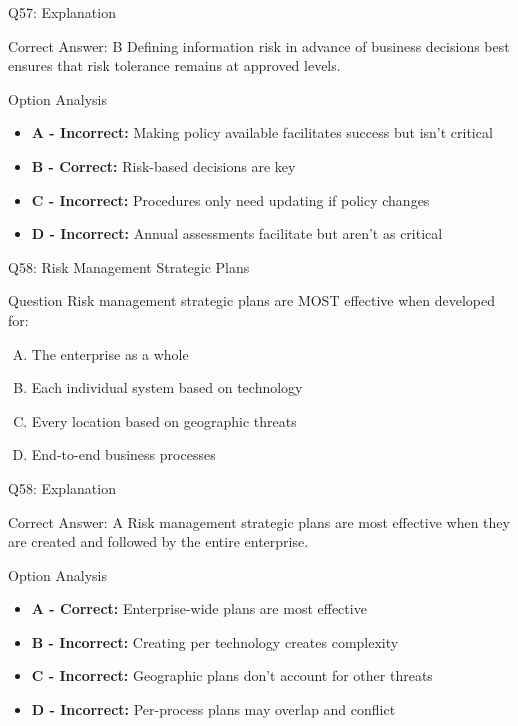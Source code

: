\documentclass{beamer}
\begin{document}
	\begin{frame}{Q57: Explanation}
		\begin{block}{Correct Answer: B}
			Defining information risk in advance of business decisions best ensures that risk tolerance remains at approved levels.
		\end{block}
		\begin{block}{Option Analysis}
			\begin{itemize}
				\item \textbf{A - Incorrect:} Making policy available facilitates success but isn't critical
				\item \textbf{B - Correct:} Risk-based decisions are key
				\item \textbf{C - Incorrect:} Procedures only need updating if policy changes
				\item \textbf{D - Incorrect:} Annual assessments facilitate but aren't as critical
			\end{itemize}
		\end{block}
	\end{frame}
	
	\begin{frame}{Q58: Risk Management Strategic Plans}
		\begin{block}{Question}
			Risk management strategic plans are MOST effective when developed for:
		\end{block}
		\begin{enumerate}[(A)]
			\item The enterprise as a whole
			\item Each individual system based on technology
			\item Every location based on geographic threats
			\item End-to-end business processes
		\end{enumerate}
	\end{frame}
	
	\begin{frame}{Q58: Explanation}
		\begin{block}{Correct Answer: A}
			Risk management strategic plans are most effective when they are created and followed by the entire enterprise.
		\end{block}
		\begin{block}{Option Analysis}
			\begin{itemize}
				\item \textbf{A - Correct:} Enterprise-wide plans are most effective
				\item \textbf{B - Incorrect:} Creating per technology creates complexity
				\item \textbf{C - Incorrect:} Geographic plans don't account for other threats
				\item \textbf{D - Incorrect:} Per-process plans may overlap and conflict
			\end{itemize}
		\end{block}
	\end{frame}
	
\end{document}

